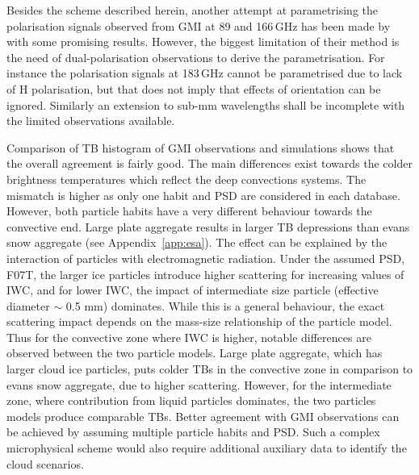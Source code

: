 \documentclass[amt, manuscript]{copernicus}
\begin{document}
Besides the scheme described herein, another attempt at parametrising the polarisation signals observed from GMI at 89 and 166\,GHz has been made by \citet{galligani:param:21} with some promising results. However, the biggest limitation of their method is the need of dual-polarisation observations to derive the parametrisation. For instance the polarisation signals at 183\,GHz cannot be parametrised due to lack of H polarisation, but that does not imply that effects of orientation can be ignored. Similarly an extension to sub-mm wavelengths shall be incomplete with the limited observations available.  




 

Comparison of TB histogram of GMI observations and simulations shows that the overall agreement is fairly good. The main differences exist towards the colder brightness temperatures which reflect the deep convections systems. The mismatch is higher as only one habit and PSD are considered in each database. However, both particle habits have a very different behaviour towards the convective end. Large plate aggregate results in larger TB depressions than evans snow aggregate (see Appendix~\ref{app:esa}). The effect can be explained by the interaction of particles with electromagnetic radiation. Under the assumed PSD, F07T, the larger ice particles introduce higher scattering for increasing values of IWC, and for lower IWC, the impact of intermediate size particle (effective diameter $\sim$ 0.5\,\,mm) dominates. While this is a general behaviour, the exact scattering impact depends on the mass-size relationship of the particle model. Thus for the convective zone where IWC is higher, notable differences are observed between the two particle models. Large plate aggregate, which has larger cloud ice particles, puts colder TBs in the convective zone in comparison to evans snow aggregate, due to higher scattering. However, for the intermediate zone, where contribution from liquid particles dominates, the two particles models produce comparable TBs. Better agreement with GMI observations can be achieved by assuming multiple particle habits and PSD. Such a complex microphysical scheme would also require additional auxiliary data to identify the cloud scenarios.  
\end{document}
